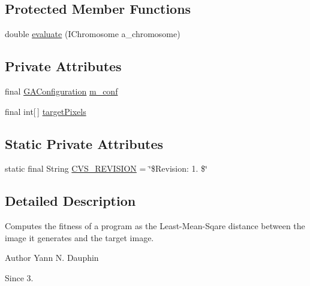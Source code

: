 \subsection*{Protected Member Functions}
\begin{DoxyCompactItemize}
\item 
double \hyperlink{classexamples_1_1monalisa_1_1core_1_1_l_m_s_fitness_function_a279ae8adf5c21ee94200c7d785c0282e}{evaluate} (I\-Chromosome a\-\_\-chromosome)
\end{DoxyCompactItemize}
\subsection*{Private Attributes}
\begin{DoxyCompactItemize}
\item 
final \hyperlink{classexamples_1_1monalisa_1_1core_1_1_g_a_configuration}{G\-A\-Configuration} \hyperlink{classexamples_1_1monalisa_1_1core_1_1_l_m_s_fitness_function_ace663d223d2211f6b36dec386165a4c4}{m\-\_\-conf}
\item 
final int\mbox{[}$\,$\mbox{]} \hyperlink{classexamples_1_1monalisa_1_1core_1_1_l_m_s_fitness_function_a54bc6cab3cf77148b2a44fba8418aabb}{target\-Pixels}
\end{DoxyCompactItemize}
\subsection*{Static Private Attributes}
\begin{DoxyCompactItemize}
\item 
static final String \hyperlink{classexamples_1_1monalisa_1_1core_1_1_l_m_s_fitness_function_a0dc2643073824aef9e12b8f133b3219c}{C\-V\-S\-\_\-\-R\-E\-V\-I\-S\-I\-O\-N} = \char`\"{}\$Revision\-: 1. \$\char`\"{}
\end{DoxyCompactItemize}


\subsection{Detailed Description}
Computes the fitness of a program as the Least-\/\-Mean-\/\-Sqare distance between the image it generates and the target image.

\begin{DoxyAuthor}{Author}
Yann N. Dauphin 
\end{DoxyAuthor}
\begin{DoxySince}{Since}
3. 
\end{DoxySince}


